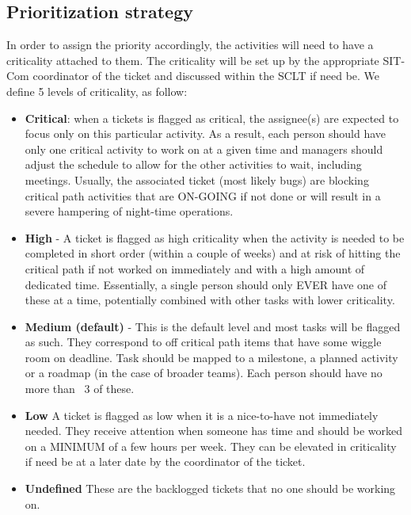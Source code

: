 \documentclass[SE,authoryear,toc]{lsstdoc}
\begin{document}
\subsection{Prioritization strategy}
In order to assign the priority accordingly, the activities will need to have a criticality attached to them.  
The criticality will be set up by the appropriate SIT-Com coordinator of the ticket and discussed within the SCLT if need be.  
We define 5 levels of criticality, as follow:
\begin{itemize}
\item{\bf Critical}: when a tickets is flagged as critical, the assignee(s) are expected to focus only on this particular activity. 
As a result, each person should have only one critical activity to work on at a given time and managers should adjust the schedule to allow for the other activities to wait, including meetings. 
Usually, the associated ticket (most likely bugs) are blocking critical path activities that are ON-GOING if not done or will result in a severe hampering of night-time operations. 

\item{\bf High} - A ticket is flagged as high criticality when the activity is needed to be completed in short order (within a couple of weeks) and at risk of hitting the critical path if not worked on immediately and with a high amount of dedicated time. 
Essentially, a single person should only EVER have one of these at a time, potentially combined with other tasks with lower criticality. 

\item{\bf Medium (default)} - This is the default level and most tasks will be flagged as such. 
They correspond to off critical path items that have some wiggle room on deadline. 
Task should be mapped to a milestone, a planned activity or a roadmap (in the case of broader teams).  
Each person should have no more than ~3 of these.

\item{\bf Low} A ticket is flagged as low when it is a nice-to-have not immediately needed. 
They receive attention when someone has time and  should be worked on a MINIMUM of a few hours per week. 
They can be elevated in criticality if need be at a later date by the coordinator of the ticket.  

\item{\bf Undefined} These are the backlogged tickets that no one should be working on.
\end{itemize}
\end{document}
